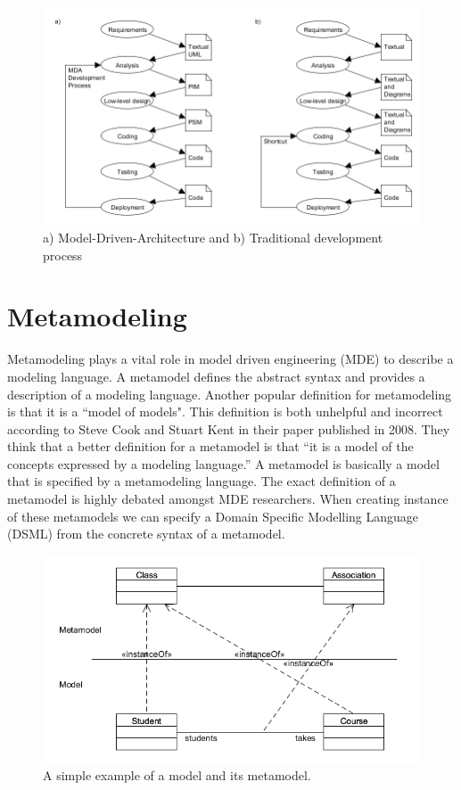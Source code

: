\begin{figure}[H]
	\centering
	\includegraphics[scale=0.5]{./Figures/MDA.png}
	\caption[Software Development with MDA]
	{a) Model-Driven-Architecture and b) Traditional development process}
	\label{fig:MDA}
\end{figure}



\section{Metamodeling}

Metamodeling plays a vital role in model driven engineering (MDE) to describe a
modeling language. A metamodel defines the abstract syntax and provides a
description of a modeling language. Another popular definition for
metamodeling is that it is a ``model of models". This definition is both
unhelpful and incorrect according to Steve Cook and Stuart Kent in their
paper\cite{Cook2008} published in 2008. They think that a better definition for
a metamodel is that ``it is a model of the concepts expressed by a modeling
language.'' A metamodel is basically a model that is specified by a
metamodeling language. The exact definition of a metamodel is highly debated
amongst MDE researchers\cite{Rutle_thesis}. When creating instance of these
metamodels we can specify a Domain Specific Modelling Language (DSML) from the
concrete syntax of a metamodel.

\begin{figure}[H]
	\centering
	\includegraphics[scale=0.6]{./Figures/SimpleMetamodel.png}
	\caption[Example of a model and metamodel]
	{A simple example of a model and its metamodel.}
	\label{fig:SimpleMetamodel}
\end{figure}

